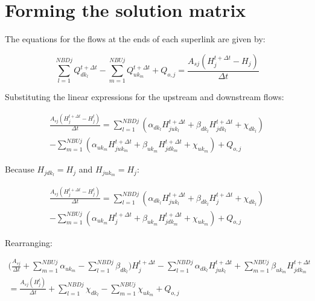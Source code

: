 \documentclass[11pt]{article}
\begin{document}
\section{Forming the solution matrix}

The equations for the flows at the ends of each superlink are given by:

\begin{equation}
  \sum_{l=1}^{NBDj} Q_{dk_l}^{t + \Delta t} - \sum_{m=1}^{NBUj} Q_{uk_m}^{t + \Delta t} + Q_{o,j} = \frac{A_{sj} (H_j^{t + \Delta t} - H_j)}{\Delta t}
\end{equation}

Substituting the linear expressions for the upstream and downstream flows:

\begin{equation}
  \begin{split}
    \frac{A_{sj} (H_j^{t + \Delta t} - H_j^t)}{\Delta t} =
    \sum_{l=1}^{NBDj} (\alpha_{dk_l} H_{juk_l}^{t + \Delta t} + \beta_{dk_l}
    H_{jdk_l}^{t + \Delta t} + \chi_{dk_l}) \\
    - \sum_{m=1}^{NBUj} (\alpha_{uk_m}
    H_{juk_m}^{t + \Delta t} + \beta_{uk_m} H_{jdk_m}^{t + \Delta t} + \chi_{uk_m}) +
    Q_{o,j}
  \end{split}
\end{equation}

Because $H_{jdk_l} = H_j$ and $H_{juk_m} = H_j$:

\begin{equation}
  \begin{split}
    \frac{A_{sj} (H_j^{t + \Delta t} - H_j^t)}{\Delta t} =
    \sum_{l=1}^{NBDj} (\alpha_{dk_l} H_{juk_l}^{t + \Delta t} + \beta_{dk_l}
    H_{j}^{t + \Delta t} + \chi_{dk_l})\\
    - \sum_{m=1}^{NBUj} (\alpha_{uk_m}
    H_{j}^{t + \Delta t} + \beta_{uk_m} H_{jdk_m}^{t + \Delta t} + \chi_{uk_m}) +
    Q_{o,j}
  \end{split}
\end{equation}

Rearranging:

\begin{equation}
  \begin{split}
    \biggl( \frac{A_{sj}}{\Delta t} + \sum_{m=1}^{NBUj} \alpha_{uk_m} - \sum_{l=1}^{NBDj} \beta_{dk_l} \biggr) H_j^{t + \Delta t} 
    - \sum_{l=1}^{NBDj} \alpha_{dk_l} H_{juk_l}^{t + \Delta t} + \sum_{m=1}^{NBUj} \beta_{uk_m} H_{jdk_m}^{t + \Delta t} \\
    =
    \frac{A_{sj} (H_j^t)}{\Delta t} + \sum_{l=1}^{NBDj} \chi_{dk_l} - \sum_{m=1}^{NBUj} \chi_{uk_m} + Q_{o,j}
  \end{split}
\end{equation}
\end{document}
